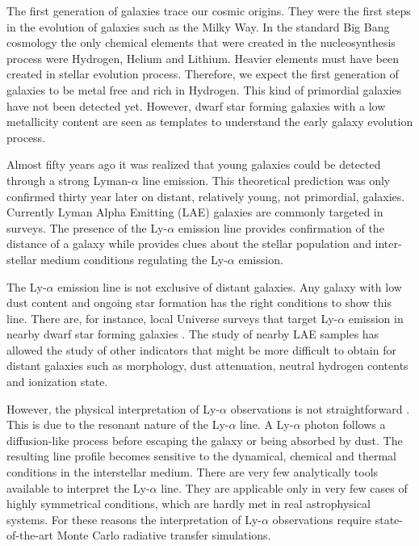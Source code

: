 \documentclass[a4paper, usenatbib, 12pt]{article}
\begin{document}
{The first generation of galaxies trace our cosmic origins. 
They were the first steps in the evolution of galaxies such as the Milky
Way. 
In the standard Big Bang cosmology the only chemical elements that
were created in the nucleosynthesis process were Hydrogen, Helium and
Lithium.  
Heavier elements must have been created in stellar evolution process. 
Therefore, we expect the first generation of
galaxies to be metal free and rich in Hydrogen. 
This kind of primordial galaxies have not been detected yet. 
However, dwarf star forming galaxies with a low metallicity content
are seen as templates to understand the early galaxy evolution process. 

Almost fifty years ago \cite{PartridgePeebles} it was realized that
young galaxies could be detected through a strong Lyman-$\alpha$ line
emission.  
This theoretical prediction was only confirmed thirty year later on
distant, relatively young, not primordial, galaxies.
Currently Lyman Alpha Emitting (LAE) galaxies are commonly targeted
in surveys. 
The presence of the Ly-$\alpha$ emission line provides confirmation of
the distance of a galaxy while provides clues about the stellar
population and inter-stellar medium conditions regulating the
Ly-$\alpha$ emission. 

The Ly-$\alpha$ emission line is not exclusive of distant galaxies. 
Any galaxy with low dust content and ongoing star formation has the
right conditions to show this line.  
There are, for instance,  local Universe surveys that target
Ly-$\alpha$ emission in nearby dwarf star forming galaxies 
\cite{LARS}. 
The study of nearby LAE samples has allowed the study of other
indicators that might be more difficult to obtain for distant galaxies
such as morphology, dust attenuation, neutral hydrogen contents and
ionization state.  

However, the physical interpretation of Ly-$\alpha$ observations is
not straightforward \cite{2015ApJ...805...14R}. 
This is due to the resonant nature of the Ly-$\alpha$ line. 
A Ly-$\alpha$ photon follows a diffusion-like process before escaping
the galaxy or being absorbed by dust. 
The resulting line profile becomes sensitive to the dynamical, chemical
and thermal conditions in the interstellar medium. 
There are very few analytically tools available to interpret the
Ly-$\alpha$ line.
They are applicable only in very few cases of highly symmetrical
conditions, which are hardly met in real astrophysical systems.
For these reasons the interpretation of Ly-$\alpha$ observations
require state-of-the-art Monte Carlo radiative transfer simulations.   


}
\end{document}
